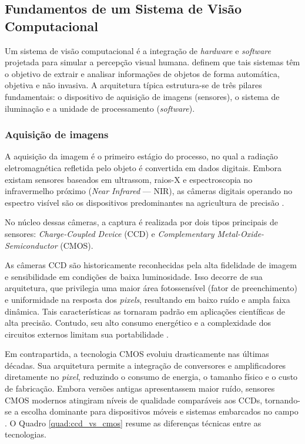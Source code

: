 \subsection{Fundamentos de um Sistema de Visão Computacional}

    Um sistema de visão computacional é a integração de \textit{hardware} e \textit{software} projetada para simular a percepção visual humana.  definem que tais sistemas têm o objetivo de extrair e analisar informações de objetos de forma automática, objetiva e não invasiva. A arquitetura típica estrutura-se de três pilares fundamentais: o dispositivo de aquisição de imagens (sensores), o sistema de iluminação e a unidade de processamento (\textit{software}).

    \subsubsection{Aquisição de imagens}

        A aquisição da imagem é o primeiro estágio do processo, no qual a radiação eletromagnética refletida pelo objeto é convertida em dados digitais. Embora existam sensores baseados em ultrassom, raios-X e espectroscopia no infravermelho próximo (\textit{Near Infrared} --- NIR), as câmeras digitais operando no espectro visível são os dispositivos predominantes na agricultura de precisão \cite{brosnan2004improving}.

        No núcleo dessas câmeras, a captura é realizada por dois tipos principais de sensores: \textit{Charge-Coupled Device} (CCD) e \textit{Complementary Metal-Oxide-Semiconductor} (CMOS).

        As câmeras CCD são historicamente reconhecidas pela alta fidelidade de imagem e sensibilidade em condições de baixa luminosidade. Isso decorre de sua arquitetura, que privilegia uma maior área fotossensível (fator de preenchimento) e uniformidade na resposta dos \textit{pixels}, resultando em baixo ruído e ampla faixa dinâmica. Tais características as tornaram padrão em aplicações científicas de alta precisão. Contudo, seu alto consumo energético e a complexidade dos circuitos externos limitam sua portabilidade \cite{littwiller2001ccd_cmos}.

        Em contrapartida, a tecnologia CMOS evoluiu drasticamente nas últimas décadas. Sua arquitetura permite a integração de conversores e amplificadores diretamente no \textit{pixel}, reduzindo o consumo de energia, o tamanho físico e o custo de fabricação. Embora versões antigas apresentassem maior ruído, sensores CMOS modernos atingiram níveis de qualidade comparáveis aos CCDs, tornando-se a escolha dominante para dispositivos móveis e sistemas embarcados no campo \cite{bigas2006cmos}. O Quadro \ref{quad:ccd_vs_cmos} resume as diferenças técnicas entre as tecnologias.

